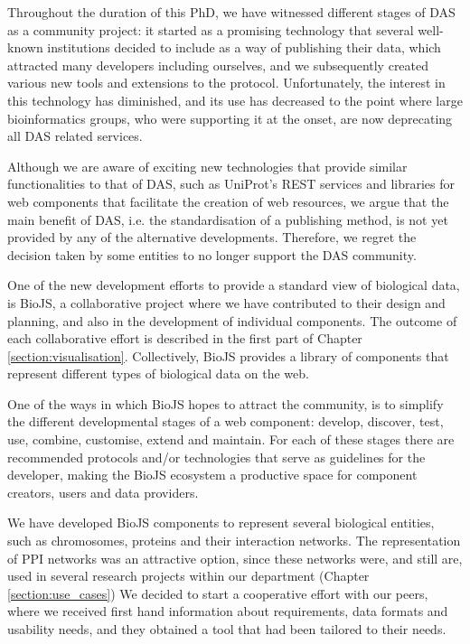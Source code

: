 Throughout the duration of this PhD, we have witnessed different stages of DAS as a community project: it started as a promising technology that several well-known institutions decided to include as a way of publishing their data, which attracted many developers including ourselves, and we subsequently created various new tools and extensions to the protocol. Unfortunately, the interest in this technology has diminished, and its use has decreased to the point where large bioinformatics groups, who were supporting it at the onset, are now deprecating all DAS related services.

Although we are aware of exciting new technologies that provide similar functionalities to that of DAS, such as UniProt's REST services and libraries for web components that facilitate the creation of web resources, we argue that the main benefit of DAS, i.e. the standardisation of a publishing method, is not yet provided by any of the alternative developments.  Therefore, we regret the decision taken by some entities to no longer support the DAS community.

\vspace{5mm}

One of the new development efforts to provide a standard view of biological data, is BioJS, a collaborative project where we have contributed to their design and planning, and also in the development of individual components.  The outcome of each collaborative effort is described in the first part of Chapter \ref{section:visualisation}. Collectively, BioJS provides a library of components that represent different types of biological data on the web. 

One of the ways in which BioJS hopes to attract the community, is to simplify the different developmental stages of a web component: develop, discover, test, use, combine, customise, extend and maintain. For each of these stages there are recommended protocols and/or technologies that serve as guidelines for the developer, making the BioJS ecosystem a productive space for component creators, users and data providers.

We have developed BioJS components to represent several biological entities, such as chromosomes, proteins and their interaction networks. The representation of PPI networks was an attractive option, since these networks were, and still are, used in several research projects within our department (Chapter \ref{section:use_cases}) We decided to start a cooperative effort with our peers, where we received first hand information about requirements, data formats and usability needs, and they obtained a tool that had been tailored to their needs.

